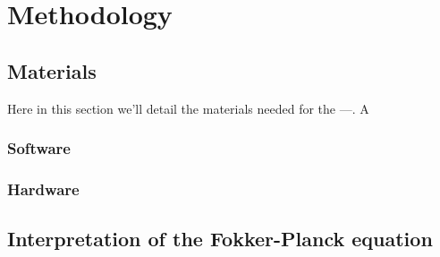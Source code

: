 
\chapter{Methodology}
\label{metodologia}
\section{Materials}
Here in this section we'll detail the materials needed for the ---. A 

\subsection{Software}
\subsection{Hardware}

\section{Interpretation of the Fokker-Planck equation}